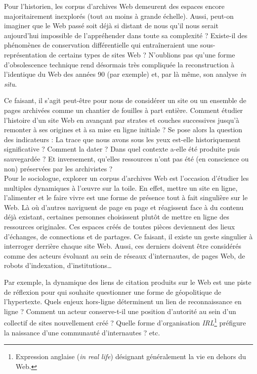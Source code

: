 \documentclass[symmetric,justified,marginals=raggedouter]{tufte-book}
\begin{document}
\noindent Pour l'historien, les corpus d'archives Web demeurent des espaces encore majoritairement inexplorés (tout au moins à grande échelle). Aussi, peut-on imaginer que le Web passé soit déjà si distant de nous qu'il nous serait aujourd'hui impossible de l'appréhender dans toute sa complexité ? Existe-il des phénomènes de conservation différentielle qui entraîneraient une sous-représentation de certains types de sites Web ? N'oublions pas qu'une forme d'obsolescence technique rend désormais très compliquée la reconstruction à l'identique du Web des années 90 (par exemple) et, par là même, son analyse \textit{in situ}. 

Ce faisant, il s'agit peut-être pour nous de considérer un site ou un ensemble de pages archivées comme un chantier de fouilles à part entière. Comment étudier l'histoire d'un site Web en avançant par strates et couches successives jusqu'à remonter à ses origines et à sa mise en ligne initiale ? Se pose alors la question des indicateurs : La trace que nous avons sous les yeux est-elle historiquement significative ? Comment la dater ? Dans quel contexte a-elle été produite puis sauvegardée ? Et inversement, qu'elles ressources n'ont pas été (en conscience ou non) préservées par les archivistes ?\\  

\noindent Pour le sociologue, explorer un corpus d'archives Web est l'occasion d'étudier les multiples dynamiques à l'œuvre sur la toile. En effet, mettre un site en ligne, l'alimenter et le faire vivre est une forme de présence tout à fait singulière sur le Web. Là où d'autres naviguent de page en page et réagissent face à du contenu déjà existant, certaines personnes choisissent plutôt de mettre en ligne des ressources originales. Ces espaces créés de toutes pièces deviennent des lieux d'échanges, de connections et de partages. Ce faisant, il existe un geste singulier à interroger derrière chaque site Web. Aussi, ces derniers doivent être considérés comme des acteurs évoluant au sein de réseaux d'internautes, de pages Web, de robots d'indexation, d'institutions\ldots{} 

Par exemple, la dynamique des liens de citation produits sur le Web est une piste de réflexion pour qui souhaite questionner une forme de géopolitique de l'hypertexte. Quels enjeux hors-ligne déterminent un lien de reconnaissance en ligne ? Comment un acteur conserve-t-il une position d'autorité au sein d'un collectif de sites nouvellement créé ? Quelle forme d'organisation \textit{IRL}\footnote{Expression anglaise (\textit{in real life}) désignant généralement la vie en dehors du Web.} préfigure la naissance d'une communauté d'internautes ? etc. 
\end{document}
